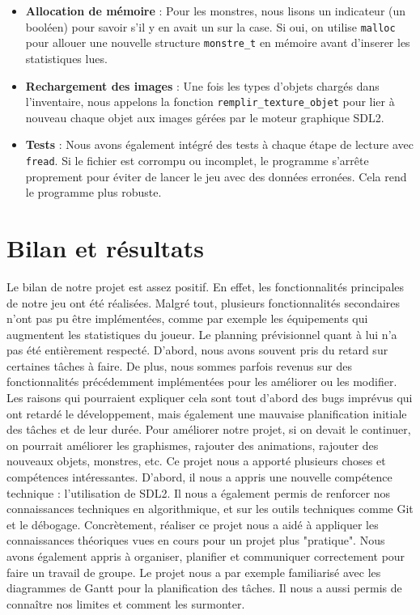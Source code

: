 \documentclass[11pt,a4paper]{article}
\begin{document}
\begin{itemize}
    \item \textbf{Allocation de mémoire} : Pour les monstres, nous lisons un indicateur (un booléen) pour savoir s'il y en avait un sur la case. Si oui, on utilise \texttt{malloc} pour allouer une nouvelle structure \texttt{monstre\_t} en mémoire avant d'inserer les statistiques lues.
    \item \textbf{Rechargement des images} : Une fois les types d'objets chargés dans l'inventaire, nous appelons la fonction \texttt{remplir\_texture\_objet} pour lier à nouveau chaque objet aux images gérées par le moteur graphique SDL2.
    \item \textbf{Tests} : Nous avons également intégré des tests à chaque étape de lecture avec \texttt{fread}. Si le fichier est corrompu ou incomplet, le programme s'arrête proprement pour éviter de lancer le jeu avec des données erronées. Cela rend le programme plus robuste.
\end{itemize}

\section{Bilan et résultats}

Le bilan de notre projet est assez positif.
En effet, les fonctionnalités principales de notre jeu ont été réalisées.
Malgré tout, plusieurs fonctionnalités secondaires n'ont pas pu être implémentées, comme par exemple les équipements qui augmentent les statistiques du joueur.
Le planning prévisionnel quant à lui n'a pas été entièrement respecté.
D'abord, nous avons souvent pris du retard sur certaines tâches à faire.
De plus, nous sommes parfois revenus sur des fonctionnalités précédemment implémentées pour les améliorer ou les modifier.
Les raisons qui pourraient expliquer cela sont tout d'abord des bugs imprévus qui ont retardé le développement, mais également une mauvaise planification initiale des tâches et de leur durée.
Pour améliorer notre projet, si on devait le continuer, on pourrait améliorer les graphismes, rajouter des animations, rajouter des nouveaux objets, monstres, etc.
Ce projet nous a apporté plusieurs choses et compétences intéressantes.
D'abord, il nous a appris une nouvelle compétence technique : l'utilisation de SDL2.
Il nous a également permis de renforcer nos connaissances techniques en algorithmique, et sur les outils techniques comme Git et le débogage.
Concrètement, réaliser ce projet nous a aidé à appliquer les connaissances théoriques vues en cours pour un projet plus "pratique".
Nous avons également appris à organiser, planifier et communiquer correctement pour faire un travail de groupe.
Le projet nous a par exemple familiarisé avec les diagrammes de Gantt pour la planification des tâches.
Il nous a aussi permis de connaître nos limites et comment les surmonter.
\end{document}
